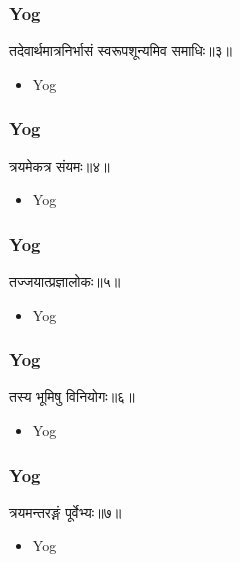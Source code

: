 \begin{frame}[fragile]\frametitle{Yog}
\begin{sanskrit}
तदेवार्थमात्रनिर्भासं स्वरूपशून्यमिव समाधिः॥३॥
\end{sanskrit}
	\begin{itemize}
	\item Yog 
	\end{itemize}
\end{frame}


\begin{frame}[fragile]\frametitle{Yog}
\begin{sanskrit}
त्रयमेकत्र संयमः॥४॥
\end{sanskrit}
	\begin{itemize}
	\item Yog 
	\end{itemize}
\end{frame}


\begin{frame}[fragile]\frametitle{Yog}
\begin{sanskrit}
तज्जयात्प्रज्ञालोकः॥५॥
\end{sanskrit}
	\begin{itemize}
	\item Yog 
	\end{itemize}
\end{frame}



\begin{frame}[fragile]\frametitle{Yog}
\begin{sanskrit}
तस्य भूमिषु विनियोगः॥६॥
\end{sanskrit}
	\begin{itemize}
	\item Yog 
	\end{itemize}
\end{frame}


\begin{frame}[fragile]\frametitle{Yog}
\begin{sanskrit}
त्रयमन्तरङ्गं पूर्वेभ्यः॥७॥
\end{sanskrit}
	\begin{itemize}
	\item Yog 
	\end{itemize}
\end{frame}


